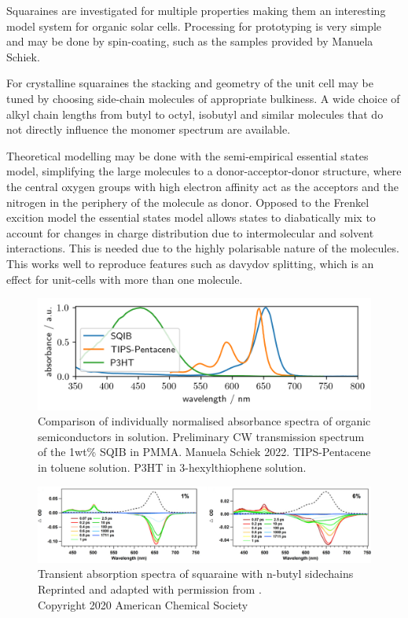 \documentclass[twoside,openright]{scrreprt}
\begin{document}
Squaraines are investigated for multiple properties making them an interesting model system for organic solar cells. Processing for prototyping is very simple and may be done by spin-coating, such as the samples provided by Manuela Schiek. 

For crystalline squaraines the stacking and geometry of the unit cell may be tuned by choosing side-chain molecules of appropriate bulkiness. A wide choice of alkyl chain lengths from butyl to octyl, isobutyl and similar molecules that do not directly influence the monomer spectrum are available. \cite{Hestand2015, Brueck2014, Balzer2022}

Theoretical modelling may be done with the semi-empirical essential states model, simplifying the large molecules to a donor-acceptor-donor structure, where the central oxygen groups with high electron affinity act as the acceptors and the nitrogen in the periphery of the molecule as donor. Opposed to the Frenkel excition model the essential states model allows states to diabatically mix to account for changes in charge distribution due to intermolecular and solvent interactions. This is needed due to the highly polarisable nature of the molecules. This works well to reproduce features such as davydov splitting, which is an effect for unit-cells with more than one molecule.\cite{Zhong2019, Hestand2015} 



\begin{figure}[hbtp]
\centering
\includegraphics[width = \textwidth]{images/spectra/OSC/ComparisonOfOSCSolution.png}
\caption{Comparison of individually normalised absorbance spectra of organic semiconductors in solution. Preliminary CW transmission spectrum of the 1wt\% SQIB in PMMA. Manuela Schiek 2022. TIPS-Pentacene in toluene solution.\cite{Schaberle2020} P3HT in 3-hexylthiophene solution\cite{Rahimi2014}.\label{fig:compOSC}}
\end{figure}

\begin{figure}[hbtp]
\centering
\includegraphics[scale=1.2]{images/Zheng2020SquaraineTAgraphCut.jpeg}
\caption{Transient absorption spectra of squaraine with n-butyl sidechains\\
Reprinted and adapted with permission from \protect{}. \\Copyright 2020 American Chemical Society}
\end{figure}
\end{document}
